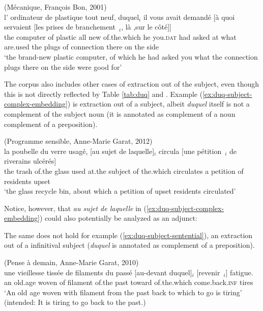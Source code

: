 \ea (Mécanique, François Bon, 2001)\\
\gll l' ordinateur de plastique tout neuf, duquel$_i$ il vous avait demandé [à quoi servaient [les prises de branchement~\trace{}$_i$, là ,sur le côté]]\\
the computer of plastic all new of.the.which he you\textsc{.dat} had asked at what are.used the plugs of connection there on the side\\
\glt `the brand-new plastic computer, of which he had asked you what the connection plugs there on the side were good for'
\z 

The corpus also includes other cases of extraction out of the subject, even though this is not directly reflected by Table \ref{tab:duq} and . Example (\ref{ex:duq-subject-complex-embedding}) is extraction out of a subject, albeit \emph{duquel} itself is not a complement of the subject noun (it is annotated as complement of a noun complement of a preposition).

\ea (Programme sensible, Anne-Marie Garat, 2012)\\
\gll la poubelle du verre usagé, [au sujet de laquelle]$_i$ circula [une pétition~\trace{}$_i$ de riverains ulcérés]\\
the trash of.the glass used at.the subject of the.which circulates a petition of residents upset\\
\glt `the glass recycle bin, about which a petition of upset residents circulated'
\label{ex:duq-subject-complex-embedding}
\z 

Notice, however, that \emph{au sujet de laquelle} in (\ref{ex:duq-subject-complex-embedding}) could also potentially be analyzed as an adjunct:

\z 

The same does not hold for example (\ref{ex:duq-subject-sentential}), an extraction out of a infinitival subject (\emph{duquel} is annotated as complement of a preposition).

\ea (Pense à demain, Anne-Marie Garat, 2010)\\
\gll une vieillesse tissée de filaments du passé [au-devant duquel]$_i$ [revenir~\trace{}$_i$] fatigue.\\
an old.age woven of filament of.the past toward of.the.which come.back\textsc{.inf} tires\\
\glt `An old age woven with filament from the past back to which to go is tiring' (intended: It is tiring to go back to the past.)
\label{ex:duq-subject-sentential}
\z


